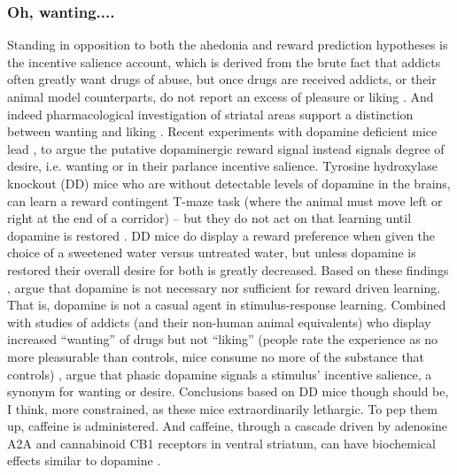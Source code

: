 \documentclass[doc,12pt]{apa}        %
\begin{document}
\subsubsection{Oh, wanting....}
\label{subsub:salience}
Standing in opposition to both the ahedonia and reward prediction hypotheses is the incentive salience account, which is derived from the brute fact that addicts often greatly want drugs of abuse, but once drugs are received addicts, or their animal model counterparts, do not report an excess of pleasure or liking \cite{Robinson:1993p8987}.  And indeed pharmacological investigation of striatal areas support a distinction between wanting and liking \cite{Berridge:2003p8998}.  Recent experiments with dopamine deficient mice lead , to argue the putative dopaminergic reward signal instead signals degree of desire, i.e. wanting or in their parlance incentive salience.  Tyrosine hydroxylase knockout (DD) mice who are without detectable levels of dopamine in the brains, can learn a reward contingent T-maze task (where the animal must move left or right at the end of a corridor) -- but they do not act on that learning until dopamine is restored \cite{Berridge:2007p7235}.  DD mice do display a reward preference when given the choice of a sweetened water versus untreated water, but unless dopamine is restored their overall desire for both is greatly decreased.  Based on these findings , argue that dopamine is not necessary nor sufficient for reward driven learning.  That is, dopamine is not a casual agent in stimulus-response learning.  Combined with studies of addicts (and their non-human animal equivalents) who display increased ``wanting'' of drugs but not ``liking'' (people rate the experience as no more pleasurable than controls, mice consume no more of the substance that controls) , argue that phasic dopamine signals a stimulus' incentive salience, a synonym for wanting or desire.  Conclusions based on DD mice though should be, I think, more constrained, as these mice extraordinarily lethargic.  To pep them up, caffeine is administered.  And caffeine, through a cascade driven by adenosine A2A and cannabinoid CB1 receptors in ventral striatum, can have biochemical effects similar to dopamine \cite{Lazarus:2011p8137, Rossi:2010p7252}.
\end{document}

